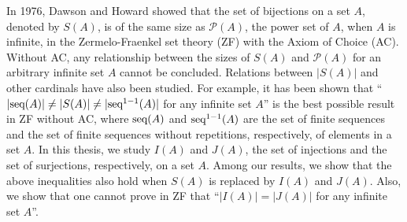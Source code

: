 \begin{englishabstract}
In 1976, Dawson and Howard showed that the set of bijections on a set $A$, denoted by $S(A)$, is of the same size as $\mathcal{P}(A)$, the power set of $A$, when $A$ is infinite, in the Zermelo-Fraenkel set theory (ZF) with the Axiom of Choice (AC). Without AC, any relationship between the sizes of $S(A)$ and $\mathcal{P}(A)$ for an arbitrary infinite set $A$ cannot be concluded. Relations between $|S(A)|$ and other cardinals have also been studied. For example, it has been shown that “$|\textup{seq}(A)| \neq |S(A)| \neq |\textup{seq}^{1-1}(A)|$ for any infinite set $A$” is the best possible result in ZF without AC, where $\textup{seq}(A)$ and $\textup{seq}^{1-1}(A)$ are the set of finite sequences and the set of finite sequences without repetitions, respectively, of elements in a set $A$. In this thesis, we study $I(A)$ and $J(A)$, the set of injections and the set of surjections, respectively, on a set $A$. Among our results, we show that the above inequalities also hold when $S(A)$ is replaced by $I(A)$ and $J(A)$. Also, we show that one cannot prove in ZF that “$|I(A)|=|J(A)|$ for any infinite set $A$”.
\end{englishabstract}


